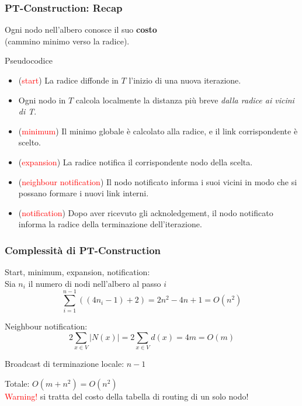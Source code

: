 \documentclass[10pt,xcolor=dvipsnames]{beamer}
\begin{document}
\begin{frame}
	\frametitle{PT-Construction: Recap}

	Ogni nodo nell'albero conosce il suo \textbf{costo}\\
	(cammino minimo verso la radice).

	\begin{block}{Pseudocodice}
	\begin{itemize}
		\item (\textcolor{red}{start}) La radice diffonde in $T$ l'inizio di una nuova iterazione.
		\item Ogni nodo in $T$ calcola localmente la distanza più breve 
			\textit{dalla radice ai vicini di T}.
		\item 	(\textcolor{red}{minimum}) Il minimo globale è calcolato alla radice, e il link corrispondente
			è scelto.
		\item 	(\textcolor{red}{expansion}) La radice notifica il corrispondente nodo della scelta.
		\item 	(\textcolor{red}{neighbour notification}) Il nodo notificato informa i suoi vicini in modo che si possano formare
			i nuovi link interni.
		\item 	(\textcolor{red}{notification}) Dopo aver ricevuto gli acknoledgement, il nodo notificato
			informa la radice della terminazione dell'iterazione. 
	\end{itemize}
	\end{block}
\end{frame}

\begin{frame}
	\frametitle{Complessità di PT-Construction}
	
	Start, minimum, expansion, notification:
	\\Sia $n_i$ il numero di nodi nell'albero al passo $i$
	$$\sum_{i=1}^{n-1}\left( \left( 4n_i-1 \right)+2 \right)=2n^2-4n+1=O(n^2)$$
	\vfill

	\pause
	Neighbour notification:
	$$2\sum_{x\in V} |N(x)|=2\sum_{x\in V}d(x)=4m=O(m)$$
	\vfill

	\pause
	Broadcast di terminazione locale: $n-1$
	\vfill

	Totale: $O(m+n^2)=O(n^2)$\\
	\pause
	\textcolor{red}{Warning!} si tratta del costo della tabella di routing di un solo nodo!
\end{frame}
\end{document}
